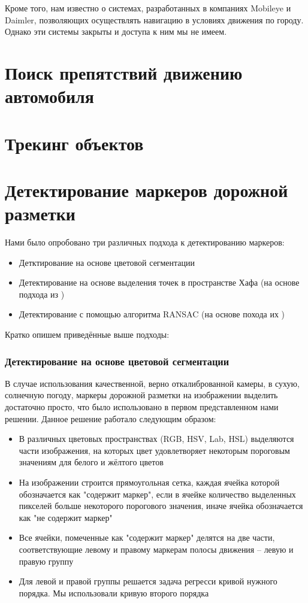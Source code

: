 \documentclass[aps,%
14pt,%
final,%
oneside,
onecolumn,%
musixtex, %
superscriptaddress,%
centertags]{extarticle} %
\begin{document}
Кроме того, нам известно о системах, разработанных в компаниях Mobileye и Daimler, позволяющих осуществлять навигацию в условиях движения по городу. Однако эти системы закрыты и доступа к ним мы не имеем.

\section {Поиск препятствий движению автомобиля }


\section{Трекинг объектов}

\section{Детектирование маркеров дорожной разметки}
Нами было опробовано три различных подхода к детектированию маркеров:
\begin{itemize}
    \item Детктирование на основе цветовой сегментации
    \item Детектирование на основе выделения точек в пространстве Хафа (на основе подхода из \cite{song2017real} )
    \item Детектирование с помощью алгоритма RANSAC (на основе похода их \cite{aly2008real} )
\end{itemize}

Кратко опишем приведённые выше подходы:

\subsubsection*{Детектирование на основе цветовой сегментации}

В случае использования качественной, верно откалиброванной камеры, в сухую, солнечную погоду, маркеры дорожной разметки на изображении выделить достаточно просто, что было использовано в первом представленном нами решении. Данное решение работало следующим образом:
\begin{itemize}
    \item В различных цветовых пространствах (RGB, HSV, Lab, HSL) выделяются части изображения, на которых цвет удовлетворяет некоторым пороговым значениям для белого и жёлтого цветов
    \item На изображении строится прямоугольная сетка, каждая ячейка которой обозначается как "содержит маркер", если в ячейке количество выделенных пикселей больше некоторого порогового значения, иначе ячейка обозначается как "не содержит маркер"
    \item Все ячейки, помеченные как "содержит маркер" делятся на две части, соответствующие левому и правому маркерам полосы движения -- левую и правую группу
    \item Для левой и правой группы решается задача регресси кривой нужного порядка. Мы использовали кривую второго порядка
\end{itemize}
\end{document}
